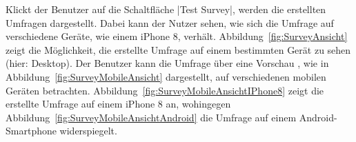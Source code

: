 Klickt der Benutzer auf die Schaltfläche \jinline|Test Survey|, werden die erstellten Umfragen dargestellt.
Dabei kann der Nutzer sehen, wie sich die Umfrage auf verschiedene Geräte, wie \zb einem iPhone 8, verhält.
Abbildung~\vref{fig:SurveyAnsicht} zeigt die Möglichkeit, die erstellte Umfrage auf einem bestimmten Gerät  zu sehen (hier: Desktop).
Der Benutzer kann die Umfrage über eine Vorschau , wie in Abbildung~\vref{fig:SurveyMobileAnsicht} dargestellt, auf verschiedenen mobilen Geräten betrachten.
Abbildung~\vref{fig:SurveyMobileAnsichtIPhone8} zeigt die erstellte Umfrage auf einem iPhone 8 an, wohingegen Abbildung~\vref{fig:SurveyMobileAnsichtAndroid} die Umfrage auf einem Android-Smartphone widerspiegelt.

\begin{figure}[!htb]
	\centering
	\captionsetup{justification=centering, format=plain}
	\hfill
	\hfill
	\hfill

\end{figure}
